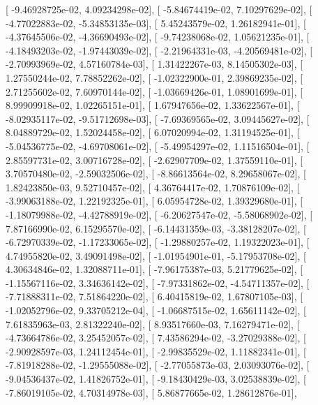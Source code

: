 \documentclass{article}
\begin{document}
       [ -9.46928725e-02,   4.09234298e-02],
       [ -5.84674419e-02,   7.10297629e-02],
       [ -4.77022883e-02,  -5.34853135e-03],
       [  5.45243579e-02,   1.26182941e-01],
       [ -4.37645506e-02,  -4.36690493e-02],
       [ -9.74238068e-02,   1.05621235e-01],
       [ -4.18493203e-02,  -1.97443039e-02],
       [ -2.21964331e-03,  -4.20569481e-02],
       [ -2.70993969e-02,   4.57160784e-03],
       [  1.31422267e-03,   8.14505302e-03],
       [  1.27550244e-02,   7.78852262e-02],
       [ -1.02322900e-01,   2.39869235e-02],
       [  2.71255602e-02,   7.60970144e-02],
       [ -1.03669426e-01,   1.08901699e-01],
       [  8.99909918e-02,   1.02265151e-01],
       [  1.67947656e-02,   1.33622567e-01],
       [ -8.02935117e-02,  -9.51712698e-03],
       [ -7.69369565e-02,   3.09445627e-02],
       [  8.04889729e-02,   1.52024458e-02],
       [  6.07020994e-02,   1.31194525e-01],
       [ -5.04536775e-02,  -4.69708061e-02],
       [ -5.49954297e-02,   1.11516504e-01],
       [  2.85597731e-02,   3.00716728e-02],
       [ -2.62907709e-02,   1.37559110e-01],
       [  3.70570480e-02,  -2.59032506e-02],
       [ -8.86613564e-02,   8.29658067e-02],
       [  1.82423850e-03,   9.52710457e-02],
       [  4.36764417e-02,   1.70876109e-02],
       [ -3.99063188e-02,   1.22192325e-01],
       [  6.05954728e-02,   1.39329680e-01],
       [ -1.18079988e-02,  -4.42788919e-02],
       [ -6.20627547e-02,  -5.58068902e-02],
       [  7.87166990e-02,   6.15295570e-02],
       [ -6.14431359e-03,  -3.38128207e-02],
       [ -6.72970339e-02,  -1.17233065e-02],
       [ -1.29880257e-02,   1.19322023e-01],
       [  4.74955820e-02,   3.49091498e-02],
       [ -1.01954901e-01,  -5.17953708e-02],
       [  4.30634846e-02,   1.32088711e-01],
       [ -7.96175387e-03,   5.21779625e-02],
       [ -1.15567116e-02,   3.34636142e-02],
       [ -7.97331862e-02,  -4.54711357e-02],
       [ -7.71888311e-02,   7.51864220e-02],
       [  6.40415819e-02,   1.67807105e-03],
       [ -1.02052796e-02,   9.33705212e-04],
       [ -1.06687515e-02,   1.65611142e-02],
       [  7.61835963e-03,   2.81322240e-02],
       [  8.93517660e-03,   7.16279471e-02],
       [ -4.73664786e-02,   3.25452057e-02],
       [  7.43586294e-02,  -3.27029388e-02],
       [ -2.90928597e-03,   1.24112454e-01],
       [ -2.99835529e-02,   1.11882341e-01],
       [ -7.81918288e-02,  -1.29555088e-02],
       [ -2.77055873e-03,   2.03093076e-02],
       [ -9.04536437e-02,   1.41826752e-01],
       [ -9.18430429e-03,   3.02538839e-02],
       [ -7.86019105e-02,   4.70314978e-03],
       [  5.86877665e-02,   1.28612876e-01],
\end{document}
